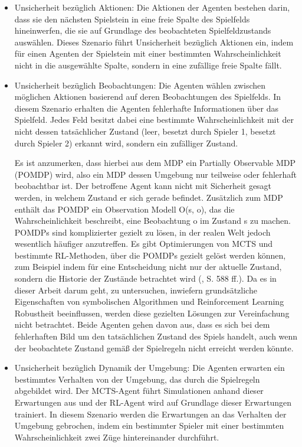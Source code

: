 \begin{itemize}
	\item Unsicherheit bezüglich Aktionen: Die Aktionen der Agenten bestehen darin, dass sie den nächsten Spielstein in eine freie Spalte des Spielfelds hineinwerfen, die sie auf Grundlage des beobachteten Spielfeldzustands auswählen. Dieses Szenario führt Unsicherheit bezüglich Aktionen ein, indem für einen Agenten der Spielstein mit einer bestimmten Wahrscheinlichkeit nicht in die ausgewählte Spalte, sondern in eine zufällige freie Spalte fällt.
	
	\item Unsicherheit bezüglich Beobachtungen: Die Agenten wählen zwischen möglichen Aktionen basierend auf deren Beobachtungen des Spielfelds. In diesem Szenario erhalten die Agenten fehlerhafte Informationen über das Spielfeld. Jedes Feld besitzt dabei eine bestimmte Wahrscheinlichkeit mit der nicht dessen tatsächlicher Zustand (leer, besetzt durch Spieler 1, besetzt durch Spieler 2) erkannt wird, sondern ein zufälliger Zustand.
	
	Es ist anzumerken, dass hierbei aus dem MDP ein Partially Observable MDP (POMDP) wird, also ein MDP dessen Umgebung nur teilweise oder fehlerhaft beobachtbar ist. Der betroffene Agent kann nicht mit Sicherheit gesagt werden, in welchem Zustand er sich gerade befindet. Zusätzlich zum MDP enthält das POMDP ein Observation Modell O(s, o), das die Wahrscheinlichkeit beschreibt, eine Beobachtung o im Zustand s zu machen. POMDPs sind komplizierter gezielt zu lösen, in der realen Welt jedoch wesentlich häufiger anzutreffen. Es gibt Optimierungen von MCTS und bestimmte RL-Methoden, über die POMDPs gezielt gelöst werden können, zum Beispiel indem für eine Entscheidung nicht nur der aktuelle Zustand, sondern die Historie der Zustände betrachtet wird (\cite{Russell.2020}, S. 588 ff.). Da es in dieser Arbeit darum geht, zu untersuchen, inwiefern grundsätzliche Eigenschaften von symbolischen Algorithmen und Reinforcement Learning Robustheit beeinflussen, werden diese gezielten Lösungen zur Vereinfachung nicht betrachtet. Beide Agenten gehen davon aus, dass es sich bei dem fehlerhaften Bild um den tatsächlichen Zustand des Spiels handelt, auch wenn der beobachtete Zustand gemäß der Spielregeln nicht erreicht werden könnte.
	
	\item Unsicherheit bezüglich Dynamik der Umgebung: Die Agenten erwarten ein bestimmtes Verhalten von der Umgebung, das durch die Spielregeln abgebildet wird. Der MCTS-Agent führt Simulationen anhand dieser Erwartungen aus und der RL-Agent wird auf Grundlage dieser Erwartungen trainiert. In diesem Szenario werden die Erwartungen an das Verhalten der Umgebung gebrochen, indem ein bestimmter Spieler mit einer bestimmten Wahrscheinlichkeit zwei Züge hintereinander durchführt.
	
\end{itemize}

